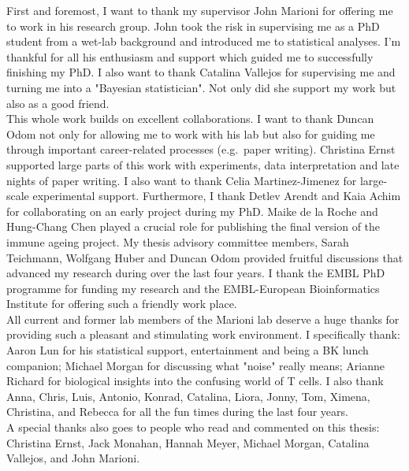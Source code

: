 
\begin{acknowledgements}      


First and foremost, I want to thank my supervisor John Marioni for offering me to work in his research group. John took the risk in supervising me as a PhD student from a wet-lab background and introduced me to statistical analyses. I'm thankful for all his enthusiasm and support which guided me to successfully finishing my PhD. I also want to thank Catalina Vallejos for supervising me and turning me into a "Bayesian statistician". Not only did she support my work but also as a good friend. \\

This whole work builds on excellent collaborations. I want to thank Duncan Odom not only for allowing me to work with his lab but also for guiding me through important career-related processes (e.g.~paper writing). Christina Ernst supported large parts of this work with experiments, data interpretation and late nights of paper writing. I also want to thank Celia Martinez-Jimenez for large-scale experimental support. Furthermore, I thank Detlev Arendt and Kaia Achim for collaborating on an early project during my PhD. Maike de la Roche and Hung-Chang Chen played a crucial role for publishing the final version of the immune ageing project. My thesis advisory committee members, Sarah Teichmann, Wolfgang Huber and Duncan Odom provided fruitful discussions that advanced my research during over the last four years. I thank the EMBL PhD programme for funding my research and the EMBL-European Bioinformatics Institute for offering such a friendly work place.\\

All current and former lab members of the Marioni lab deserve a huge thanks for providing such a pleasant and stimulating work environment. I specifically thank: Aaron Lun for his statistical support, entertainment and being a BK lunch companion; Michael Morgan for discussing what "noise" really means; Arianne Richard for biological insights into the confusing world of T cells. I also thank Anna, Chris, Luis, Antonio, Konrad, Catalina, Liora, Jonny, Tom, Ximena, Christina, and Rebecca for all the fun times during the last four years. \\

A special thanks also goes to people who read and commented on this thesis: Christina Ernst, Jack Monahan, Hannah Meyer, Michael Morgan, Catalina Vallejos, and John Marioni. 


\end{acknowledgements}
